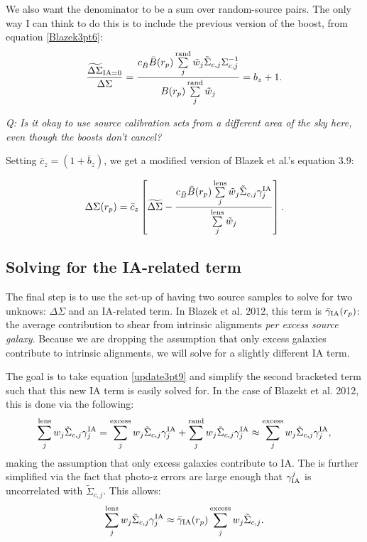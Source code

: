 \documentclass[onecolumn,amsmath,aps,fleqn, superscriptaddress]{revtex4}
\begin{document}
We also want the denominator to be a sum over random-source pairs. The only way I can think to do this is to include the previous version of the boost, from equation \ref{Blazek3pt6}:
\begin{equation}
\frac{\widetilde{\Delta \Sigma}_{\rm IA = 0}}{\Delta \Sigma} = \frac{c_{\bar B} \bar{B}(r_p) \sum\limits^{\rm rand}_{j} \tilde{w}_j \tilde{\Sigma}_{c,j} \Sigma_{c,j}^{-1}}{B(r_p)\sum\limits^{\rm rand}_{j} \tilde{w}_j} = b_z+1.
\label{update3pt7v3}
\end{equation}
{{\it Q: Is it okay to use source calibration sets from a different area of the sky here, even though the boosts don't cancel?}

Setting $\bar{c}_z = (1+\bar{b}_z)$, we get a modified version of Blazek et al.'s equation 3.9:

\begin{equation}
\Delta\Sigma(r_p) = \bar{c}_z \left[\widetilde{\Delta \Sigma} - \frac{c_{\bar B}\bar{B}(r_p) \sum\limits_{j}^{\rm lens} \tilde{w}_j \tilde{\Sigma}_{c,j}\gamma^{\rm IA}_j }{\sum\limits_{j}^{\rm lens} \tilde{w}_j}\right].
\label{update3pt9}
\end{equation}

\subsection*{Solving for the IA-related term}

The final step is to use the set-up of having two source samples to solve for two unknows: $\Delta \Sigma$ and an IA-related term. In Blazek et al. 2012, this term is $\bar{\gamma}_{\rm IA}(r_p)$: the average contribution to shear from intrinsic alignments {\it per excess source galaxy}. Because we are dropping the assumption that only excess galaxies contribute to intrinsic alignments, we will solve for a slightly different IA term.

The goal is to take equation \ref{update3pt9} and simplify the second bracketed term such that this new IA term is easily solved for. In the case of Blazekt et al. 2012, this is done via the following:
\begin{equation}
\sum\limits_{j}^{\rm lens} w_j \tilde{\Sigma}_{c,j} \gamma^{\rm IA}_j = \sum\limits_{j}^{\rm excess} w_j \tilde{\Sigma}_{c,j} \gamma^{\rm IA}_j + \sum\limits_{j}^{\rm rand} w_j \tilde{\Sigma}_{c,j} \gamma^{\rm IA}_j \approx \sum\limits_{j}^{\rm excess} w_j \tilde{\Sigma}_{c,j} \gamma^{\rm IA}_j,
\label{splitIAexcess}
\end{equation}
making the assumption that only excess galaxies contribute to IA. The is further simplified via the fact that photo-z errors are large enough that $\gamma_{\rm IA}^j$ is uncorrelated with $\tilde{\Sigma}_{c,j}$. This allows:
\begin{equation}
\sum\limits_{j}^{\rm lens} w_j \tilde{\Sigma}_{c,j} \gamma^{\rm IA}_j \approx \bar{\gamma}_{\rm IA}(r_p)\sum\limits_{j}^{\rm excess} w_j \tilde{\Sigma}_{c,j}.
\label{splitIAexcess}
\end{equation}

}
\end{document}
